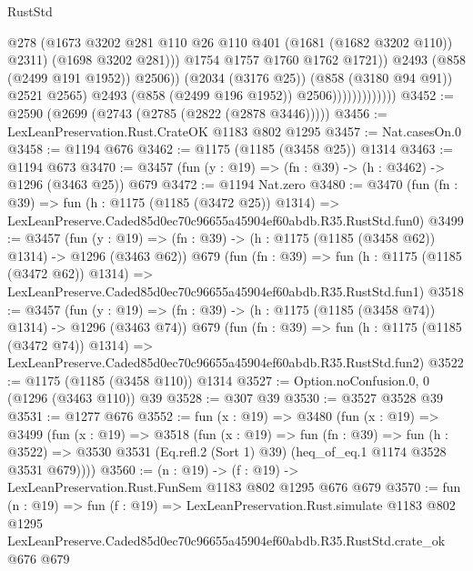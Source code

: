 \begin{lexlean}{RustStd}
\begin{coremodule}
                                            @278
                                            (@1673
                                              @3202
                                              @281
                                              @110
                                              @26
                                              @110
                                              @401
                                              (@1681 (@1682 @3202 @110))
                                              @2311)
                                            (@1698 @3202 @281)))
                                        @1754
                                        @1757
                                        @1760
                                        @1762
                                        @1721))
                                    @2493
                                    (@858 (@2499 @191 @1952))
                                    @2506))
                                (@2034 (@3176 @25))
                                (@858 (@3180 @94 @91))
                                @2521
                                @2565)
                              @2493
                              (@858 (@2499 @196 @1952))
                              @2506)))))))))))))
@3452 := @2590 (@2699 (@2743 (@2785 (@2822 (@2878 @3446)))))
@3456 := LexLeanPreservation.Rust.CrateOK @1183 @802 @1295
@3457 := Nat.casesOn.{0}
@3458 := @1194 @676
@3462 := @1175 (@1185 (@3458 @25)) @1314
@3463 := @1194 @673
@3470 := @3457 (fun (y : @19) => (fn : @39) -> (h : @3462) -> @1296 (@3463 @25)) @679
@3472 := @1194 Nat.zero
@3480 := @3470
    (fun (fn : @39) =>
    fun (h : @1175 (@1185 (@3472 @25)) @1314) =>
    LexLeanPreserve.Caded85d0ec70c96655a45904ef60abdb.R35.RustStd.fun0)
@3499 := @3457
    (fun (y : @19) => (fn : @39) -> (h : @1175 (@1185 (@3458 @62)) @1314) -> @1296 (@3463 @62))
    @679
    (fun (fn : @39) =>
    fun (h : @1175 (@1185 (@3472 @62)) @1314) =>
    LexLeanPreserve.Caded85d0ec70c96655a45904ef60abdb.R35.RustStd.fun1)
@3518 := @3457
    (fun (y : @19) => (fn : @39) -> (h : @1175 (@1185 (@3458 @74)) @1314) -> @1296 (@3463 @74))
    @679
    (fun (fn : @39) =>
    fun (h : @1175 (@1185 (@3472 @74)) @1314) =>
    LexLeanPreserve.Caded85d0ec70c96655a45904ef60abdb.R35.RustStd.fun2)
@3522 := @1175 (@1185 (@3458 @110)) @1314
@3527 := Option.noConfusion.{0, 0} (@1296 (@3463 @110)) @39
@3528 := @307 @39
@3530 := @3527 @3528 @39
@3531 := @1277 @676
@3552 := fun (x : @19) =>
  @3480
    (fun (x : @19) =>
    @3499
      (fun (x : @19) =>
      @3518
        (fun (x : @19) =>
        fun (fn : @39) =>
        fun (h : @3522) =>
        @3530 @3531 (Eq.refl.{2} (Sort 1) @39) (heq_of_eq.{1} @1174 @3528 @3531 @679))))
@3560 := (n : @19) -> (f : @19) -> LexLeanPreservation.Rust.FunSem @1183 @802 @1295 @676 @679
@3570 := fun (n : @19) =>
  fun (f : @19) =>
  LexLeanPreservation.Rust.simulate
    @1183
    @802
    @1295
    LexLeanPreserve.Caded85d0ec70c96655a45904ef60abdb.R35.RustStd.crate_ok
    @676
    @679
\end{coremodule}
\end{lexlean}
